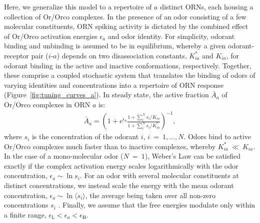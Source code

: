 Here, we generalize this model to a repertoire of $a$ distinct ORNs, each housing a collection of Or/Orco complexes. In the presence of an odor consisting of a few molecular constituents, ORN spiking activity is dictated by the combined effect of Or/Orco activation energies $\epsilon_a$ and  odor identity. For simplicity, odorant binding and unbinding is assumed to be in equilibrium, whereby a given odorant-receptor pair ($i$-$a$) depends on two disassociation constants, $K^*_{ia}$ and $K_{ia}$, for odorant binding in the active and inactive conformations, respectively. Together, these comprise a coupled stochastic system that translates the binding of odors of varying identities and concentrations into a repertoire of ORN response (Figure~\ref{fig:tuning_curves_a}). In steady state, the active fraction $\bar A_a$ of Or/Orco complexes in ORN $a$ is:
\begin{align}
\bar{A}_a = \left(1 + e^{\epsilon_a}\frac{1 + \sum_i^N s_i/K_{ia}}{1 + \sum_i^N s_i/K^*_{ia}}\right)^{-1},
\label{eq:steady_state_act}
\end{align}
where $s_i$ is the concentration of the odorant $i$, $i~=~1,...,N$. Odors bind to active Or/Orco complexes much faster than to inactive complexes, whereby $K^*_{ia}~\ll~K_{ia}$. In the case of a mono-molecular odor ($N~=~1$), Weber's Law can be satisfied exactly if the complex activation energy scales logarithmically with the odor concentration, $\epsilon_a \sim \ln s_i$. For an odor with several molecular constituents at distinct concentrations, we instead scale the energy with the mean odorant concentration, $\epsilon_a \sim \ln \langle s_i \rangle$, the average being taken over all non-zero concentrations $s_i$ . Finally, we assume that the free energies modulate only within a finite range, $\epsilon_{\text {L}} < \epsilon_a < \epsilon_{\text {H}}$.








